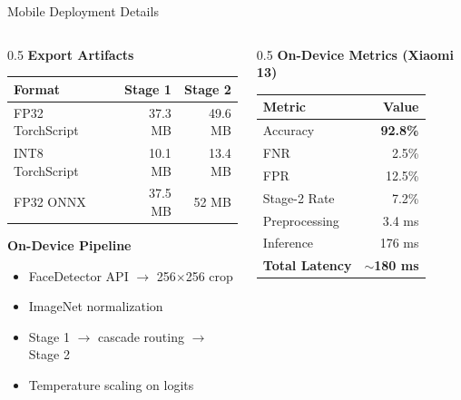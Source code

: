 \documentclass[aspectratio=169,12pt]{beamer}
\newcommand{\highlight}[1]{\textcolor{primaryblue}{\textbf{#1}}}
\begin{document}
\begin{frame}{Mobile Deployment Details}
\begin{columns}[T]
\begin{column}{0.5\textwidth}
\textbf{Export Artifacts}
\begin{center}
\scriptsize
\begin{tabular}{lrr}
\toprule
\textbf{Format} & \textbf{Stage 1} & \textbf{Stage 2} \\
\midrule
FP32 TorchScript & 37.3 MB & 49.6 MB \\
INT8 TorchScript & 10.1 MB & 13.4 MB \\
FP32 ONNX & 37.5 MB & 52 MB \\
\bottomrule
\end{tabular}
\end{center}

\vspace{0.3em}
\textbf{On-Device Pipeline}
\begin{itemize}
\setlength\itemsep{0.1em}
    \item FaceDetector API $\rightarrow$ 256$\times$256 crop
    \item ImageNet normalization
    \item Stage 1 $\rightarrow$ cascade routing $\rightarrow$ Stage 2
    \item Temperature scaling on logits
\end{itemize}
\end{column}

\begin{column}{0.5\textwidth}
\textbf{On-Device Metrics (Xiaomi 13)}
\begin{center}
\scriptsize
\begin{tabular}{lr}
\toprule
\textbf{Metric} & \textbf{Value} \\
\midrule
Accuracy & \highlight{92.8\%} \\
FNR & 2.5\% \\
FPR & 12.5\% \\
Stage-2 Rate & 7.2\% \\
\midrule
Preprocessing & 3.4 ms \\
Inference & 176 ms \\
\textbf{Total Latency} & \highlight{$\sim$180 ms} \\
\bottomrule
\end{tabular}
\end{center}


\end{column}
\end{columns}
\end{frame}
\end{document}
